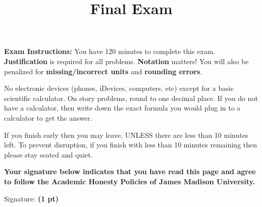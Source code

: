\documentclass[12pt, addpoints]{exam/exam}
\title{\vspace{-8pc}
\vfill{\Huge
	\bf Final Exam %
	} 
	}
\date{}
\newcommand{\1}{^{-1}}
\theoremstyle{plain}
\begin{document}
\begin{coverpages}
\maketitle
\thispagestyle{headandfoot}
\vspace{-4pc}
{\bf Exam Instructions:} You have 120 minutes to complete this exam.  \textbf{Justification} is required for all problems.  \textbf{Notation} matters!  You will also be penalized for \textbf{missing/incorrect units} and \textbf{rounding errors}. 

\vspace{1pc} 
No electronic devices (phones, iDevices, computers, etc) except for a basic scientific calculator.  On story problems, round to one decimal place.  If you do not have a calculator, then write down the exact formula you would plug in to a calculator to get the answer. 

\vspace{1pc}
If you finish early then you may leave, UNLESS there are less than 10 minutes left.  To prevent disruption, if you finish with less than 10 minutes remaining then please stay seated and quiet.

\begin{flushright}

\vspace{0.3in}

\vspace{0.3in}
\end{flushright}

\vfill
\textbf{Your signature below indicates that you have read this page and agree to follow the Academic Honesty Policies of James Madison University.}  

\vspace{0.3in}
Signature: {\bf (1 pt)} \underline{\hspace{73ex}}

\newpage
\vspace*{\fill}
\gradetable
\end{coverpages}
\end{document}
